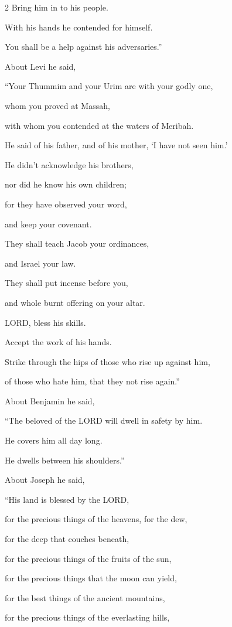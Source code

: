 \begin{multicols}{2}
Bring him in to his people.

With his hands he contended for himself.

You shall be a help against his adversaries.”

\myverse{}About Levi he said,

“Your Thummim and your Urim are with your godly one,

whom you proved at Massah,

with whom you contended at the waters of Meribah.

\myverse{}He said of his father, and of his mother, ‘I have not seen him.’

He didn’t acknowledge his brothers,

nor did he know his own children;

for they have observed your word,

and keep your covenant.

\myverse{}They shall teach Jacob your ordinances,

and Israel your law.

They shall put incense before you,

and whole burnt offering on your altar.

\myverse{}LORD, bless his skills.

Accept the work of his hands.

Strike through the hips of those who rise up against him,

of those who hate him, that they not rise again.”

\myverse{}About Benjamin he said,

“The beloved of the LORD will dwell in safety by him.

He covers him all day long.

He dwells between his shoulders.”

\myverse{}About Joseph he said,

“His land is blessed by the LORD,

for the precious things of the heavens, for the dew,

for the deep that couches beneath,

\myverse{}for the precious things of the fruits of the sun,

for the precious things that the moon can yield,

\myverse{}for the best things of the ancient mountains,

for the precious things of the everlasting hills,


\end{multicols}
